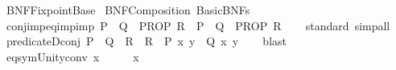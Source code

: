 %
\begin{isabellebody}%
%
%
\isadelimdocument
%
\endisadelimdocument
%
\isatagdocument
%
\isamarkuptrue%
%
\endisatagdocument
{\isafolddocument}%
%
\isadelimdocument
%
\endisadelimdocument
%
\isadelimtheory
%
\endisadelimtheory
%
\isatagtheory
{}\isamarkupfalse%
\ BNF{\isacharunderscore}{\kern0pt}Fixpoint{\isacharunderscore}{\kern0pt}Base\isanewline
{}\ BNF{\isacharunderscore}{\kern0pt}Composition\ Basic{\isacharunderscore}{\kern0pt}BNFs\isanewline
{}%
\endisatagtheory
{\isafoldtheory}%
%
\isadelimtheory
\isanewline
%
\endisadelimtheory
\isanewline
{}\isamarkupfalse%
\ conj{\isacharunderscore}{\kern0pt}imp{\isacharunderscore}{\kern0pt}eq{\isacharunderscore}{\kern0pt}imp{\isacharunderscore}{\kern0pt}imp{\isacharcolon}{\kern0pt}\ {\isachardoublequoteopen}{\isacharparenleft}{\kern0pt}P\ {\isasymand}\ Q\ {\isasymLongrightarrow}\ PROP\ R{\isacharparenright}{\kern0pt}\ {\isasymequiv}\ {\isacharparenleft}{\kern0pt}P\ {\isasymLongrightarrow}\ Q\ {\isasymLongrightarrow}\ PROP\ R{\isacharparenright}{\kern0pt}{\isachardoublequoteclose}\isanewline
%
\isadelimproof
\ \ %
\endisadelimproof
%
\isatagproof
{}\isamarkupfalse%
\ standard\ simp{\isacharunderscore}{\kern0pt}all%
\endisatagproof
{\isafoldproof}%
%
\isadelimproof
\isanewline
%
\endisadelimproof
\isanewline
{}\isamarkupfalse%
\ predicate{}D{\isacharunderscore}{\kern0pt}conj{\isacharcolon}{\kern0pt}\ {\isachardoublequoteopen}P\ {\isasymle}\ Q\ {\isasymand}\ R\ {\isasymLongrightarrow}\ R\ {\isasymand}\ {\isacharparenleft}{\kern0pt}P\ x\ y\ {\isasymlongrightarrow}\ Q\ x\ y{\isacharparenright}{\kern0pt}{\isachardoublequoteclose}\isanewline
%
\isadelimproof
\ \ %
\endisadelimproof
%
\isatagproof
{}\isamarkupfalse%
\ blast%
\endisatagproof
{\isafoldproof}%
%
\isadelimproof
\isanewline
%
\endisadelimproof
\isanewline
{}\isamarkupfalse%
\ eq{\isacharunderscore}{\kern0pt}sym{\isacharunderscore}{\kern0pt}Unity{\isacharunderscore}{\kern0pt}conv{\isacharcolon}{\kern0pt}\ {\isachardoublequoteopen}{\isacharparenleft}{\kern0pt}x\ {\isacharequal}{\kern0pt}\ {\isacharparenleft}{\kern0pt}{\isacharparenleft}{\kern0pt}{\isacharparenright}{\kern0pt}\ {\isacharequal}{\kern0pt}\ {\isacharparenleft}{\kern0pt}{\isacharparenright}{\kern0pt}{\isacharparenright}{\kern0pt}{\isacharparenright}{\kern0pt}\ {\isacharequal}{\kern0pt}\ x{\isachardoublequoteclose}\isanewline

\end{isabellebody}
